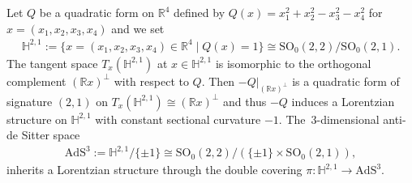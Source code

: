 \documentclass[11pt]{article}
\numberwithin{equation}{section}
\numberwithin{equation}{section}
\begin{document}
Let $Q$ be a quadratic form on $\mathbb{R}^{4}$ defined by
$Q(x) = x_1^2 + x_2^2-x_3^2-x_4^2$ for $x= (x_1,x_2,x_3,x_4)$ and
we set
\begin{gather*}
\mathbb{H}^{2,1}:=\big\{x=(x_1,x_2,x_3,x_4) \in \mathbb{R}^4 \mid Q(x) = 1\big\}
\cong \mathrm{SO}_{0}(2,2)/\mathrm{SO}_{0}(2,1).
\end{gather*}
The tangent space $T_{x}(\mathbb{H}^{2,1})$ at $x\in\mathbb{H}^{2,1}$
is isomorphic to the orthogonal complement $(\mathbb{R} x)^{\bot}$ with respect to $Q$.
Then $-Q|_{(\mathbb{R} x)^{\bot}}$ is
a quadratic form of signature $(2,1)$ on
$T_{x}(\mathbb{H}^{2,1}) \cong (\mathbb{R} x)^{\bot}$ and
thus $-Q$ induces a Lorentzian structure on $\mathbb{H}^{2,1}$
with constant sectional curvature $-1$.
The~$3$-di\-men\-sional anti-de Sitter space
\begin{gather*}
\mathrm{AdS}^{3}:=\mathbb{H}^{2,1}/\{\pm 1\}
\cong \mathrm{SO}_{0}(2,2)/(\{\pm1\}\times\mathrm{SO}_{0}(2,1)),
\end{gather*}
inherits a Lorentzian structure through
the double covering $\pi\colon\mathbb{H}^{2,1}\rightarrow\mathrm{AdS}^{3}$.
\end{document}
